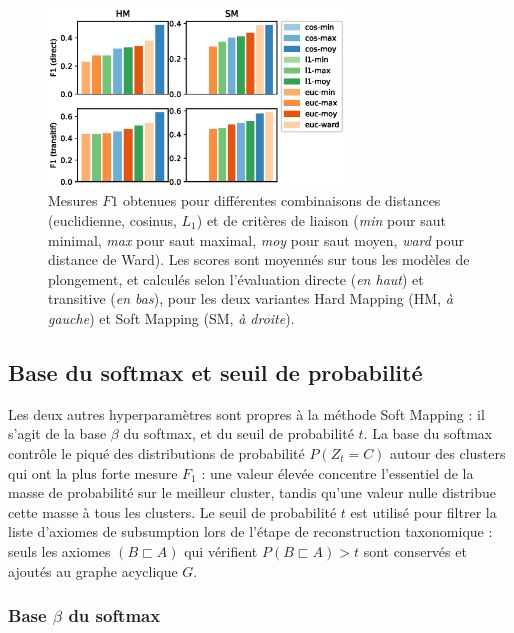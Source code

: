 \begin{figure}[h]
    \centering
    \includegraphics[width=0.7\textwidth]{fig/plot/taxex_cluparams-all.eps}
    \caption[Influence des paramètres de regroupement sur l'extraction de taxonomie]{Mesures $F1$ obtenues pour différentes combinaisons de distances (euclidienne, cosinus, $L_1$) et de critères de liaison (\textit{min} pour saut minimal, \textit{max} pour saut maximal, \textit{moy} pour saut moyen, \textit{ward} pour distance de Ward). Les scores sont moyennés sur tous les modèles de plongement, et calculés selon l'évaluation directe (\textit{en haut}) et transitive (\textit{en bas}), pour les deux variantes Hard Mapping (HM, \textit{à gauche}) et Soft Mapping (SM, \textit{à droite}).}
    \label{fig:taxex-cluparams-all}
\end{figure}

\subsection{Base du softmax et seuil de probabilité}
\label{subsec:te-hp-beta}

Les deux autres hyperparamètres sont propres à la méthode Soft Mapping : il s'agit de la base $\beta$ du softmax, et du seuil de probabilité $t$. La base du softmax contrôle le piqué des distributions de probabilité $P(Z_t = C)$ autour des clusters qui ont la plus forte mesure $F_1$ : une valeur élevée concentre l'essentiel de la masse de probabilité sur le meilleur cluster, tandis qu'une valeur nulle distribue cette masse à tous les clusters. Le seuil de probabilité $t$ est utilisé pour filtrer la liste d'axiomes de subsumption lors de l'étape de reconstruction taxonomique : seuls les axiomes $(B \sqsubset A)$ qui vérifient $P(B \sqsubset A) > t$ sont conservés et ajoutés au graphe acyclique $G$.


\subsubsection{Base \texorpdfstring{$\beta$}{beta} du softmax}

